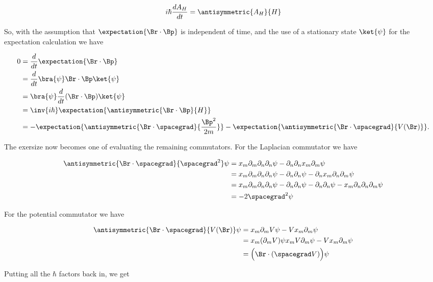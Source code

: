\begin{align}\label{eqn:desaiCh3:103}
i\hbar \frac{d A_H}{dt} = \antisymmetric{A_H}{H}
\end{align}

So, with the assumption that $\expectation{\Br \cdot \Bp}$ is independent of time, and the use of a stationary state $\ket{\psi}$ for the expectation calculation we have

\begin{align*}
0 &=
\frac{d}{dt} \expectation{\Br \cdot \Bp}  \\
&=
\frac{d}{dt} \bra{\psi} \Br \cdot \Bp \ket{\psi} \\
&=
\bra{\psi} 
\frac{d}{dt} ( \Br \cdot \Bp ) \ket{\psi} \\
&= 
\inv{i\hbar} \expectation{ \antisymmetric{ \Br \cdot \Bp }{H} } \\
&= 
-\expectation{ \antisymmetric{ \Br \cdot \spacegrad }{\frac{\Bp^2}{2m}} } 
-\expectation{ \antisymmetric{ \Br \cdot \spacegrad }{V(\Br)} }.
\end{align*}

The exersize now becomes one of evaluating the remaining commutators.  For the Laplacian commutator we have

\begin{align*}
\antisymmetric{ \Br \cdot \spacegrad }{\spacegrad^2} \psi
&=
x_m \partial_m \partial_n \partial_n \psi 
- \partial_n \partial_n x_m \partial_m \psi \\
&=
x_m \partial_m \partial_n \partial_n \psi 
- \partial_n \partial_n \psi 
- \partial_n x_m \partial_n \partial_m \psi \\
&=
x_m \partial_m \partial_n \partial_n \psi 
- \partial_n \partial_n \psi 
- \partial_n \partial_n \psi 
- x_m \partial_n \partial_n \partial_m \psi \\
&=
- 2 \spacegrad^2 \psi
\end{align*}

For the potential commutator we have

\begin{align*}
\antisymmetric{ \Br \cdot \spacegrad }{V(\Br)} \psi
&=
x_m \partial_m V \psi 
-V x_m \partial_m \psi  \\
&=
x_m (\partial_m V) \psi 
x_m V \partial_m \psi 
-V x_m \partial_m \psi  \\
&=
\Bigl( \Br \cdot (\spacegrad V) \Bigr) \psi
\end{align*}

Putting all the $\hbar$ factors back in, we get

